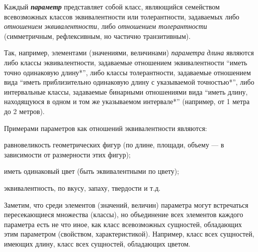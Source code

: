 Каждый \textbf{\textit{параметр}} представляет собой класс, являющийся семейством всевозможных классов эквивалентности или толерантности, задаваемых либо \textit{отношением эквивалентности}, либо \textit{отношением толерантности} (симметричным, рефлексивным, но частично транзитивным).

Так, например, элементами (значениями, величинами) \textit{параметра} \textit{длина} являются либо классы эквивалентности, задаваемые отношением эквивалентности ``иметь точно одинаковую длину*'', либо классы толерантности, задаваемые отношением вида ``иметь приблизительно одинаковую длину с указываемой точностью*'', либо интервальные классы, задаваемые бинарными отношениями вида ``иметь длину, находящуюся в одном и том же указываемом интервале*'' (например, от 1 метра до 2 метров).

Примерами параметров как отношений эквивалентности являются:

\begin{textitemize}
	\item равновеликость геометрических фигур (по длине, площади, объему --- в зависимости от размерности этих фигур);
	\item иметь одинаковый цвет (быть эквивалентными по цвету);
	\item эквивалентность, по вкусу, запаху, твердости и т.д.
\end{textitemize}

Заметим, что среди элементов (значений, величин) параметра могут встречаться пересекающиеся множества (классы), но объединение всех элементов каждого параметра есть не что иное, как класс всевозможных сущностей, обладающих этим параметром (свойством, характеристикой). Например, класс всех сущностей, имеющих длину, класс всех сущностей, обладающих цветом.

\begin{SCn}
\begin{scnsubdividing}
\end{scnsubdividing}
\end{SCn}
		
